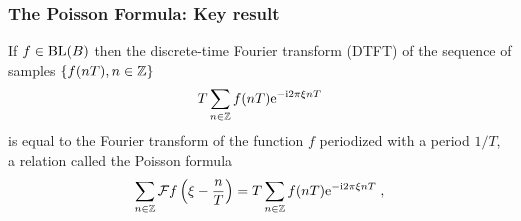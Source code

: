 \begin{frame}
\frametitle{The Poisson Formula: Key result}
If $f \in \mathrm{BL}(B)$ then the \alert{discrete-time Fourier transform} (DTFT) of the sequence of samples $\{ f(nT), n \in \mathbb{Z} \}$
\[
T \sum_{n \in \mathbb{Z}} f(nT) \mathrm{e}^{- \mathrm{i} 2 \pi \xi n T}
\]
is equal to the Fourier transform of the function $f$ periodized with a period $1/T$, a relation called the \alert{Poisson formula}
\begin{equation*}
\label{eq:FormuleSommatoirePoisson}
\sum_{n \in \mathbb{Z}} \mathcal{F} f \left( \xi - \frac{n}{T} \right)  = T \sum_{n \in \mathbb{Z}} f(nT) \mathrm{e}^{- \mathrm{i} 2 \pi \xi n T}\;,
\end{equation*}
\end{frame}

%

%
%
%

